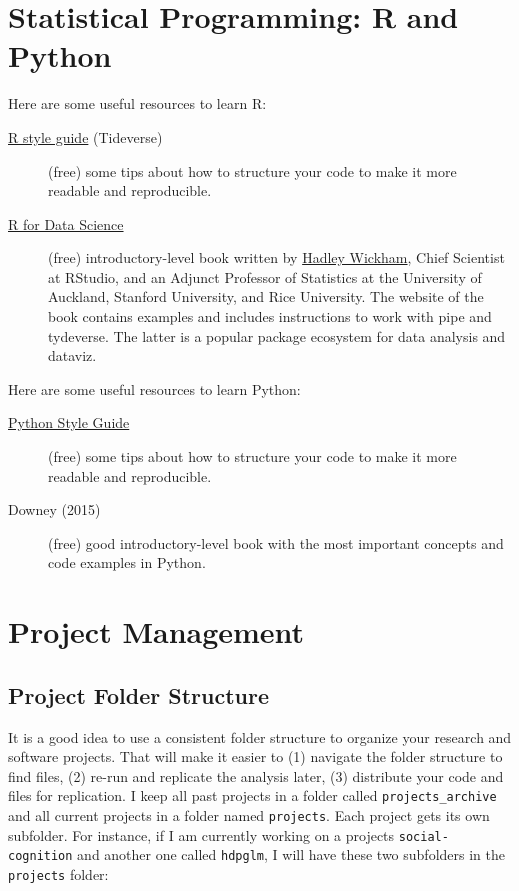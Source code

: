 \documentclass[a4paper]{article}
\begin{document}
\section{Statistical Programming: R and Python}
\label{sec:org4e9a6ff}
Here are some useful resources to learn R:

\begin{description}
\item[{\href{https://style.tidyverse.org/}{R style guide} (Tideverse)}] (free) some tips about how to structure your code to make it more readable and reproducible.
\item[{\href{https://r4ds.had.co.nz/}{R for Data Science}}] (free) introductory-level book written by \href{http://hadley.nz/}{Hadley Wickham}, Chief Scientist at RStudio, and an Adjunct Professor of Statistics at the University of Auckland, Stanford University, and Rice University. The website of the book contains examples and includes instructions to work with pipe and tydeverse. The latter is a popular package ecosystem for data analysis and dataviz.
\end{description}


Here are some useful resources to learn Python:

\begin{description}
\item[{\href{https://www.python.org/dev/peps/pep-0008/}{Python Style Guide}}] (free) some tips about how to structure your code to make it more readable and reproducible.
\item[{Downey (2015)}] (free) good introductory-level book with the most important concepts and code examples in Python.
\end{description}
\section{Project Management}
\label{sec:orgeafa053}
\subsection{Project Folder Structure}
\label{sec:org73b6a13}
It is a good idea to use a consistent folder structure to organize your research and software projects. That will make it easier to (1) navigate the folder structure to find files, (2) re-run and replicate the analysis later, (3) distribute your code and files for replication. I keep all past projects in a folder called \texttt{projects\_archive} and all current projects in a folder named \texttt{projects}. Each project gets its own subfolder. For instance, if I am currently working on a projects \texttt{social-cognition} and another one called \texttt{hdpglm}, I will have these two subfolders in the \texttt{projects} folder:
\end{document}

